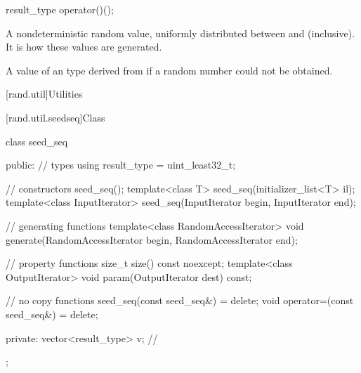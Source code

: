 %
\begin{itemdecl}
result_type operator()();
\end{itemdecl}

\begin{itemdescr}
\pnum
\returns
A nondeterministic random value,
 uniformly distributed
 between  and  (inclusive).
 It is 
 how these values are generated.

\pnum
\throws
A value of an 
 type derived from 
 if a random number could not be obtained.
\end{itemdescr}




[rand.util]{Utilities}%
%


[rand.util.seedseq]{Class }%

%
%
\begin{codeblock}
class seed_seq {
public:
  // types
  using result_type = uint_least32_t;

  // constructors
  seed_seq();
  template<class T>
    seed_seq(initializer_list<T> il);
  template<class InputIterator>
    seed_seq(InputIterator begin, InputIterator end);

  // generating functions
  template<class RandomAccessIterator>
    void generate(RandomAccessIterator begin, RandomAccessIterator end);

  // property functions
  size_t size() const noexcept;
  template<class OutputIterator>
    void param(OutputIterator dest) const;

  // no copy functions
  seed_seq(const seed_seq&) = delete;
  void operator=(const seed_seq&) = delete;

private:
  vector<result_type> v;        // \expos
};
\end{codeblock}



